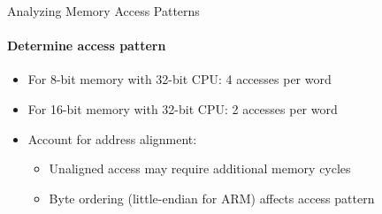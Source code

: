 \begin{KR}{Analyzing Memory Access Patterns}
\paragraph{Determine access pattern}
\begin{itemize}
    \item For 8-bit memory with 32-bit CPU: 4 accesses per word
    \item For 16-bit memory with 32-bit CPU: 2 accesses per word
    \item Account for address alignment:
    \begin{itemize}
        \item Unaligned access may require additional memory cycles
        \item Byte ordering (little-endian for ARM) affects access pattern
    \end{itemize}
\end{itemize}
\end{KR}

